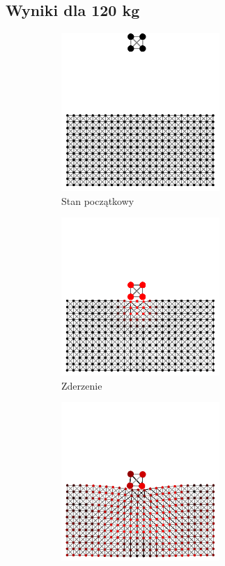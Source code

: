 \documentclass[12pt, letterpaper]{report}
\begin{document}
    \subsection{Wyniki dla 120 kg}
    \begin{figure}[h]

        \begin{subfigure}{0.5\textwidth}
            \centering
            \includegraphics[width=6cm, height=6cm]{collision_2x2_24x12_mass30_1} 
            \caption{Stan początkowy}
        \end{subfigure}
        \begin{subfigure}{0.5\textwidth}
            \centering
            \includegraphics[width=6cm, height=6cm]{collision_2x2_24x12_mass30_2}
            \caption{Zderzenie}
        \end{subfigure}
        \begin{subfigure}{0.5\textwidth}
            \centering
            \includegraphics[width=6cm, height=6cm]{collision_2x2_24x12_mass30_3}

\end{subfigure}
\end{figure}
\end{document}
